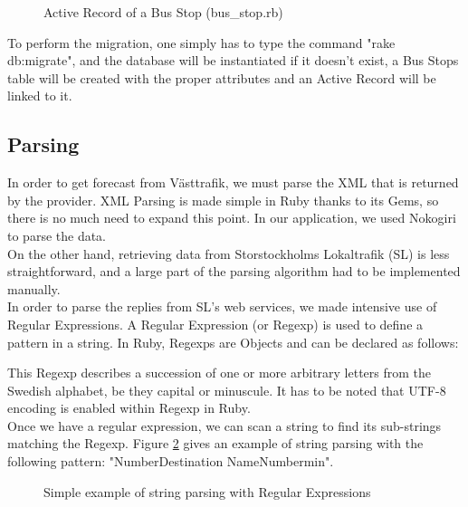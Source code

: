 \begin{figure}[ht]
  \centering
  \caption{Active Record of a Bus Stop (bus\_stop.rb)}
  \label{fig:bus_stop}
\end{figure}

To perform the migration, one simply has to type the command "rake db:migrate", and the database will be instantiated if it doesn't exist, a Bus Stops table will be created with the proper attributes and an Active Record will be linked to it.

\subsection{Parsing}

In order to get forecast from Västtrafik, we must parse the XML that is returned by the provider. XML Parsing is made simple in Ruby thanks to its Gems, so there is no much need to expand this point. In our application, we used Nokogiri \cite{Nok10} to parse the data.\\

On the other hand, retrieving data from Storstockholms Lokaltrafik (SL) is less straightforward, and a large part of the parsing algorithm had to be implemented manually.\\

In order to parse the replies from SL's web services, we made intensive use of Regular Expressions. A Regular Expression (or Regexp) is used to define a pattern in a string. In Ruby, Regexps are Objects and can be declared as follows:

\parbox{15cm}{

}

This Regexp describes a succession of one or more arbitrary letters from the Swedish alphabet, be they capital or minuscule. It has to be noted that UTF-8 encoding is enabled within Regexp in Ruby.\\

Once we have a regular expression, we can scan a string to find its sub-strings matching the Regexp. Figure \ref{fig:regex_scan_example} gives an example of string parsing with the following pattern: "Number\textvisiblespace{}Destination Name\textvisiblespace{}Number\textvisiblespace{}min".\\
\begin{figure}[ht]
  \centering
  \caption{Simple example of string parsing with Regular Expressions}
  \label{fig:regex_scan_example}
\end{figure}

